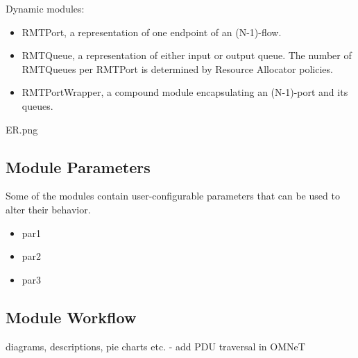             Dynamic modules:
            \begin{itemize}
                \item RMTPort, a representation of one endpoint of an (N-1)-flow.
                \item RMTQueue, a representation of either input or output queue. The number of RMTQueues per RMTPort is determined by Resource Allocator policies.
                \item RMTPortWrapper, a compound module encapsulating an (N-1)-port and its queues.
            \end{itemize}

            ER.png

        \subsection{Module Parameters}
            Some of the modules contain user-configurable parameters that can be used to alter their behavior. %
            \begin{itemize}
                \item par1
                \item par2
                \item par3
            \end{itemize}


        \subsection{Module Workflow}
            diagrams, descriptions, pie charts etc.
            - add PDU traversal in OMNeT

